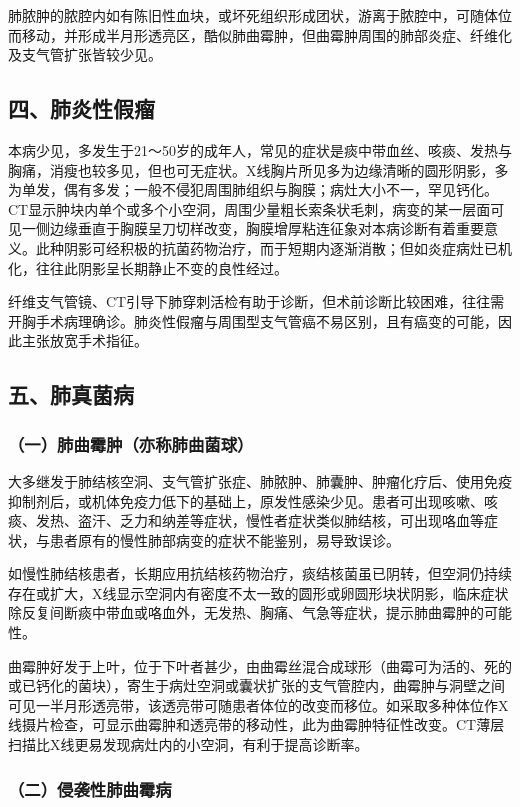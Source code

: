 肺脓肿的脓腔内如有陈旧性血块，或坏死组织形成团状，游离于脓腔中，可随体位而移动，并形成半月形透亮区，酷似肺曲霉肿，但曲霉肿周围的肺部炎症、纤维化及支气管扩张皆较少见。

\subsection{四、肺炎性假瘤}

本病少见，多发生于21～50岁的成年人，常见的症状是痰中带血丝、咳痰、发热与胸痛，消瘦也较多见，但也可无症状。X线胸片所见多为边缘清晰的圆形阴影，多为单发，偶有多发；一般不侵犯周围肺组织与胸膜；病灶大小不一，罕见钙化。CT显示肿块内单个或多个小空洞，周围少量粗长索条状毛刺，病变的某一层面可见一侧边缘垂直于胸膜呈刀切样改变，胸膜增厚粘连征象对本病诊断有着重要意义。此种阴影可经积极的抗菌药物治疗，而于短期内逐渐消散；但如炎症病灶已机化，往往此阴影呈长期静止不变的良性经过。

纤维支气管镜、CT引导下肺穿刺活检有助于诊断，但术前诊断比较困难，往往需开胸手术病理确诊。肺炎性假瘤与周围型支气管癌不易区别，且有癌变的可能，因此主张放宽手术指征。

\subsection{五、肺真菌病}

\subsubsection{（一）肺曲霉肿（亦称肺曲菌球）}

大多继发于肺结核空洞、支气管扩张症、肺脓肿、肺囊肿、肿瘤化疗后、使用免疫抑制剂后，或机体免疫力低下的基础上，原发性感染少见。患者可出现咳嗽、咳痰、发热、盗汗、乏力和纳差等症状，慢性者症状类似肺结核，可出现咯血等症状，与患者原有的慢性肺部病变的症状不能鉴别，易导致误诊。

如慢性肺结核患者，长期应用抗结核药物治疗，痰结核菌虽已阴转，但空洞仍持续存在或扩大，X线显示空洞内有密度不太一致的圆形或卵圆形块状阴影，临床症状除反复间断痰中带血或咯血外，无发热、胸痛、气急等症状，提示肺曲霉肿的可能性。

曲霉肿好发于上叶，位于下叶者甚少，由曲霉丝混合成球形（曲霉可为活的、死的或已钙化的菌块），寄生于病灶空洞或囊状扩张的支气管腔内，曲霉肿与洞壁之间可见一半月形透亮带，该透亮带可随患者体位的改变而移位。如采取多种体位作X线摄片检查，可显示曲霉肿和透亮带的移动性，此为曲霉肿特征性改变。CT薄层扫描比X线更易发现病灶内的小空洞，有利于提高诊断率。

\subsubsection{（二）侵袭性肺曲霉病}

